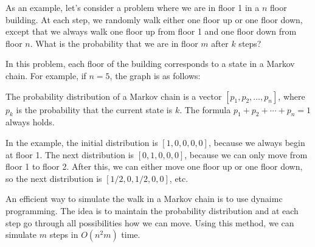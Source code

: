 As an example, let's consider a problem
where we are in floor 1 in a $n$ floor building.
At each step, we randomly walk either one floor
up or one floor down, except that we always
walk one floor up from floor 1 and one floor down
from floor $n$.
What is the probability that we are in floor $m$
after $k$ steps?

In this problem, each floor of the building
corresponds to a state in a Markov chain.
For example, if $n=5$, the graph is as follows:

\begin{center}
\end{center}

The probability distribution
of a Markov chain is a vector
$[p_1,p_2,\ldots,p_n]$, where $p_k$ is the
probability that the current state is $k$.
The formula $p_1+p_2+\cdots+p_n=1$ always holds.

In the example, the initial distribution is
$[1,0,0,0,0]$, because we always begin at floor 1.
The next distribution is $[0,1,0,0,0]$,
because we can only move from floor 1 to floor 2.
After this, we can either move one floor up
or one floor down, so the next distribution is
$[1/2,0,1/2,0,0]$, etc.

An efficient way to simulate the walk in
a Markov chain is to use dynaimc programming.
The idea is to maintain the probability distribution
and at each step go through all possibilities
how we can move.
Using this method, we can simulate $m$ steps
in $O(n^2 m)$ time.

